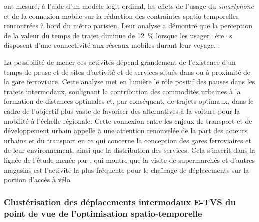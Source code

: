 \begin{refsegment}
{    \textcolor{blue}{\textcite[21]{bounie_what_2019}} ont mesuré, à l'aide d'un modèle logit ordinal, les effets de l'usage du \textsl{smartphone} et de la connexion mobile sur la réduction des contraintes spatio-temporelles rencontrées à bord du métro parisien. Leur analyse a démontré que la perception de la valeur du temps de trajet diminue de 12~\% lorsque les usager·ère·s disposent d'une connectivité aux réseaux mobiles durant leur voyage.
}.%

La possibilité de mener ces activités dépend grandement de l'existence d'un temps de pause et de sites d'activité et de services situés dans ou à proximité de la gare ferroviaire. Cette analyse met en lumière le rôle positif des pauses dans les trajets intermodaux, soulignant la contribution des commodités urbaines à la formation de distances optimales et, par conséquent, de trajets optimaux, dans le cadre de l'objectif plus vaste de favoriser des alternatives à la voiture pour la mobilité à l'échelle régionale. Cette connexion entre les enjeux de transport et de développement urbain appelle à une attention renouvelée de la part des acteurs urbains et du transport en ce qui concerne la conception des gares ferroviaires et de leur environnement, ainsi que la distribution des services. Cela s'inscrit dans la lignée de l'étude menée par \textcolor{blue}{\textcite[468]{jonkeren_bicycle_2021}}, qui montre que la visite de supermarchés et d'autres magasins est l'activité la plus fréquente pour le chaînage de déplacements sur la portion d'accès à vélo.%

\subsubsection*{Clustérisation des déplacements intermodaux \acrshort{E-TVS} du point de vue de l'optimisation spatio-temporelle
    \label{chap5:clusterisation-detours}
    }


\end{refsegment}
